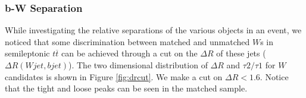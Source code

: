 \subsubsection{b-W Separation}
While investigating the relative separations of the various objects in an event, we noticed that some discrimination between matched and unmatched $W$s in semileptonic $t\overline{t}$ can be achieved through a cut on the $\Delta R$ of these jets ($\Delta R(Wjet, bjet)$). The two dimensional distribution of $\Delta R$ and $\tau 2/\tau 1$ for $W$ candidates is shown in Figure \ref{fig:drcut}. We make a cut on $\Delta R < 1.6$. Notice that the tight and loose peaks can be seen in the matched sample.
